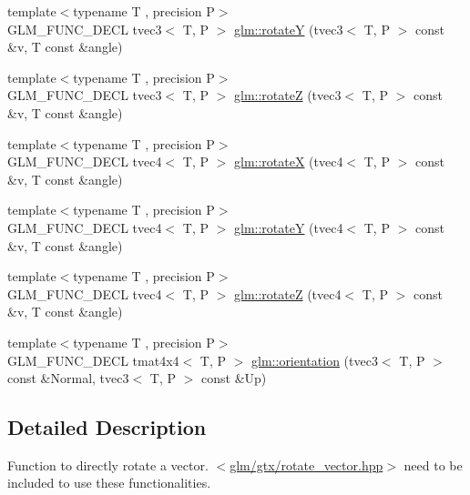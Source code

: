 \begin{DoxyCompactItemize}
{\footnotesize template$<$typename T , precision P$>$ }\\G\-L\-M\-\_\-\-F\-U\-N\-C\-\_\-\-D\-E\-C\-L tvec3$<$ T, P $>$ \hyperlink{group__gtx__rotate__vector_gabb5d19eba5befeebcb35a0aad4a114e3}{glm\-::rotate\-Y} (tvec3$<$ T, P $>$ const \&v, T const \&angle)
\item 
{\footnotesize template$<$typename T , precision P$>$ }\\G\-L\-M\-\_\-\-F\-U\-N\-C\-\_\-\-D\-E\-C\-L tvec3$<$ T, P $>$ \hyperlink{group__gtx__rotate__vector_gae30ac01b89d4f16a972fee696c964908}{glm\-::rotate\-Z} (tvec3$<$ T, P $>$ const \&v, T const \&angle)
\item 
{\footnotesize template$<$typename T , precision P$>$ }\\G\-L\-M\-\_\-\-F\-U\-N\-C\-\_\-\-D\-E\-C\-L tvec4$<$ T, P $>$ \hyperlink{group__gtx__rotate__vector_gadab312d430a564741ae02215255027a0}{glm\-::rotate\-X} (tvec4$<$ T, P $>$ const \&v, T const \&angle)
\item 
{\footnotesize template$<$typename T , precision P$>$ }\\G\-L\-M\-\_\-\-F\-U\-N\-C\-\_\-\-D\-E\-C\-L tvec4$<$ T, P $>$ \hyperlink{group__gtx__rotate__vector_gae2507577c4bffa3548b32852791dd90c}{glm\-::rotate\-Y} (tvec4$<$ T, P $>$ const \&v, T const \&angle)
\item 
{\footnotesize template$<$typename T , precision P$>$ }\\G\-L\-M\-\_\-\-F\-U\-N\-C\-\_\-\-D\-E\-C\-L tvec4$<$ T, P $>$ \hyperlink{group__gtx__rotate__vector_ga034e5d197ab4bd8685624bc2cf16e586}{glm\-::rotate\-Z} (tvec4$<$ T, P $>$ const \&v, T const \&angle)
\item 
{\footnotesize template$<$typename T , precision P$>$ }\\G\-L\-M\-\_\-\-F\-U\-N\-C\-\_\-\-D\-E\-C\-L tmat4x4$<$ T, P $>$ \hyperlink{group__gtx__rotate__vector_ga49b4d082305cdfcfe0a5c184f684a902}{glm\-::orientation} (tvec3$<$ T, P $>$ const \&Normal, tvec3$<$ T, P $>$ const \&Up)
\end{DoxyCompactItemize}


\subsection{Detailed Description}
Function to directly rotate a vector. $<$\hyperlink{rotate__vector_8hpp}{glm/gtx/rotate\-\_\-vector.\-hpp}$>$ need to be included to use these functionalities. 

